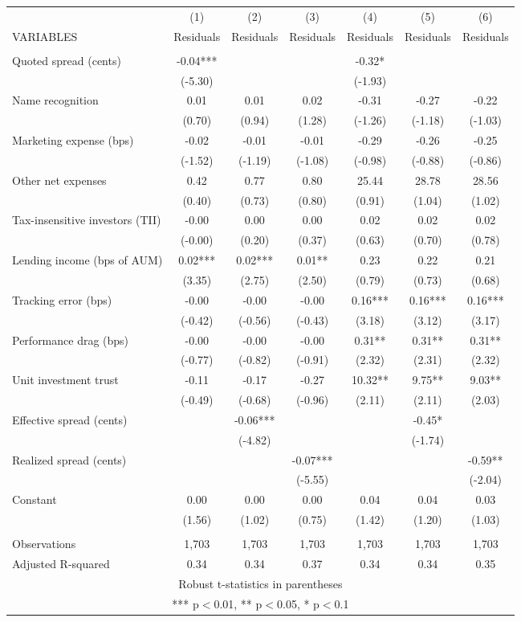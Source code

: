 \documentclass[]{article}
\begin{document}
\begin{tabular}{lcccccc} \hline
 & (1) & (2) & (3) & (4) & (5) & (6) \\
VARIABLES & Residuals & Residuals & Residuals & Residuals & Residuals & Residuals \\ \hline
 &  &  &  &  &  &  \\
Quoted spread (cents) & -0.04*** &  &  & -0.32* &  &  \\
 & (-5.30) &  &  & (-1.93) &  &  \\
Name recognition & 0.01 & 0.01 & 0.02 & -0.31 & -0.27 & -0.22 \\
 & (0.70) & (0.94) & (1.28) & (-1.26) & (-1.18) & (-1.03) \\
Marketing expense (bps) & -0.02 & -0.01 & -0.01 & -0.29 & -0.26 & -0.25 \\
 & (-1.52) & (-1.19) & (-1.08) & (-0.98) & (-0.88) & (-0.86) \\
Other net expenses & 0.42 & 0.77 & 0.80 & 25.44 & 28.78 & 28.56 \\
 & (0.40) & (0.73) & (0.80) & (0.91) & (1.04) & (1.02) \\
Tax-insensitive investors (TII) & -0.00 & 0.00 & 0.00 & 0.02 & 0.02 & 0.02 \\
 & (-0.00) & (0.20) & (0.37) & (0.63) & (0.70) & (0.78) \\
Lending income (bps of AUM) & 0.02*** & 0.02*** & 0.01** & 0.23 & 0.22 & 0.21 \\
 & (3.35) & (2.75) & (2.50) & (0.79) & (0.73) & (0.68) \\
Tracking error (bps) & -0.00 & -0.00 & -0.00 & 0.16*** & 0.16*** & 0.16*** \\
 & (-0.42) & (-0.56) & (-0.43) & (3.18) & (3.12) & (3.17) \\
Performance drag (bps) & -0.00 & -0.00 & -0.00 & 0.31** & 0.31** & 0.31** \\
 & (-0.77) & (-0.82) & (-0.91) & (2.32) & (2.31) & (2.32) \\
Unit investment trust & -0.11 & -0.17 & -0.27 & 10.32** & 9.75** & 9.03** \\
 & (-0.49) & (-0.68) & (-0.96) & (2.11) & (2.11) & (2.03) \\
Effective spread (cents) &  & -0.06*** &  &  & -0.45* &  \\
 &  & (-4.82) &  &  & (-1.74) &  \\
Realized spread (cents) &  &  & -0.07*** &  &  & -0.59** \\
 &  &  & (-5.55) &  &  & (-2.04) \\
Constant & 0.00 & 0.00 & 0.00 & 0.04 & 0.04 & 0.03 \\
 & (1.56) & (1.02) & (0.75) & (1.42) & (1.20) & (1.03) \\
 &  &  &  &  &  &  \\
Observations & 1,703 & 1,703 & 1,703 & 1,703 & 1,703 & 1,703 \\
 Adjusted R-squared & 0.34 & 0.34 & 0.37 & 0.34 & 0.34 & 0.35 \\ \hline
\multicolumn{7}{c}{ Robust t-statistics in parentheses} \\
\multicolumn{7}{c}{ *** p$<$0.01, ** p$<$0.05, * p$<$0.1} \\
\end{tabular}
\end{document}
